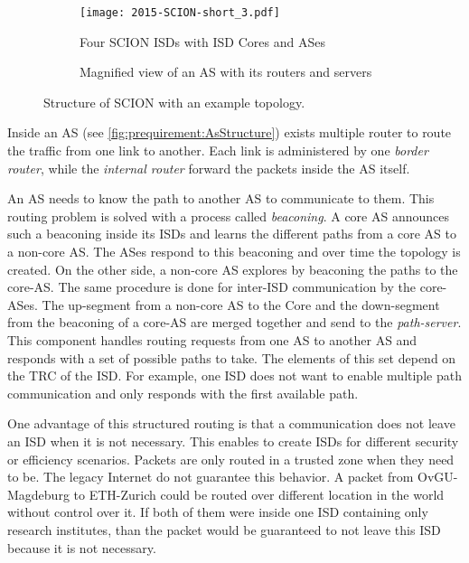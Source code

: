\documentclass[thesis.tex]{subfiles}
\begin{document}
\begin{figure}[h]
	\centering
	\begin{subfigure}{.48\linewidth}
		\centering
		\texttt{[image: 2015-SCION-short\_3.pdf]}
		\caption{Four SCION ISDs with ISD Cores and ASes \cite[Figure~1]{SCIONPaper}}
		\label{fig:prequirement:scionStructure}
	\end{subfigure}
	\hfill
	\begin{subfigure}{0.48\linewidth}
		\centering
		\caption{Magnified view of an AS with its routers and servers \cite[Figure~2b]{SCIONPaper}}
		\label{fig:prequirement:AsStructure}
	\end{subfigure}
	\caption{Structure of SCION with an example topology.}
	\label{fig:prequirement:structureOfScion}
\end{figure}

Inside an AS (see \autoref{fig:prequirement:AsStructure}) exists multiple router to route the traffic from one link to another. Each link is administered by one \textit{border router}, while the \textit{internal router} forward the packets inside the AS itself.

An AS needs to know the path to another AS to communicate to them. This routing problem is solved with a process called \textit{beaconing}. A core AS announces such a beaconing inside its ISDs and learns the different paths from a core AS to a non-core AS. The ASes respond to this beaconing and over time the topology is created. On the other side, a non-core AS explores by beaconing the paths to the core-AS. The same procedure is done for inter-ISD communication by the core-ASes. The up-segment from a non-core AS to the Core and the down-segment from the beaconing of a core-AS are merged together and send to the \textit{path-server}. This component handles routing requests from one AS to another AS and responds with a set of possible paths to take. The elements of this set depend on the TRC of the ISD. For example, one ISD does not want to enable multiple path communication and only responds with the first available path.

One advantage of this structured routing is that a communication does not leave an ISD when it is not necessary. This enables to create ISDs for different security or efficiency scenarios. Packets are only routed in a trusted zone when they need to be. The legacy Internet do not guarantee this behavior. A packet from OvGU-Magdeburg to ETH-Zurich could be routed over different location in the world without control over it. If both of them were inside one ISD containing only research institutes, than the packet would be guaranteed to not leave this ISD because it is not necessary.
\end{document}
